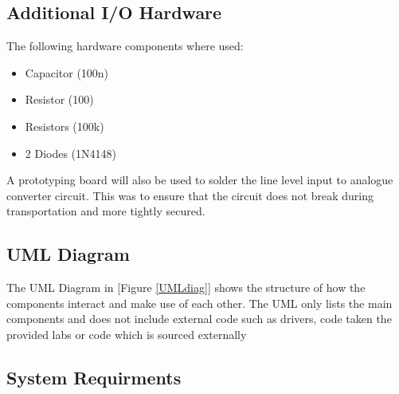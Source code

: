 \documentclass{cce2014-design}
\begin{document}
\subsection{Additional I/O Hardware}
The following hardware components where used: 
\begin{itemize}
    \item Capacitor (100n)
    \item Resistor (100)
    \item Resistors (100k) 
    \item 2 Diodes (1N4148)
\end{itemize}

A prototyping board will also be used to solder the line level input to
analogue converter circuit. This was to ensure that the circuit does not
break during transportation and more tightly secured.

\subsection{UML Diagram}
The UML Diagram in [Figure \ref{UMLdiag}] shows the structure of how the
components interact and make use of each other. The UML only lists the main
components and does not include external code such as drivers, code taken
the provided labs or code which is sourced externally


\subsection{System Requirments}
\end{document}
